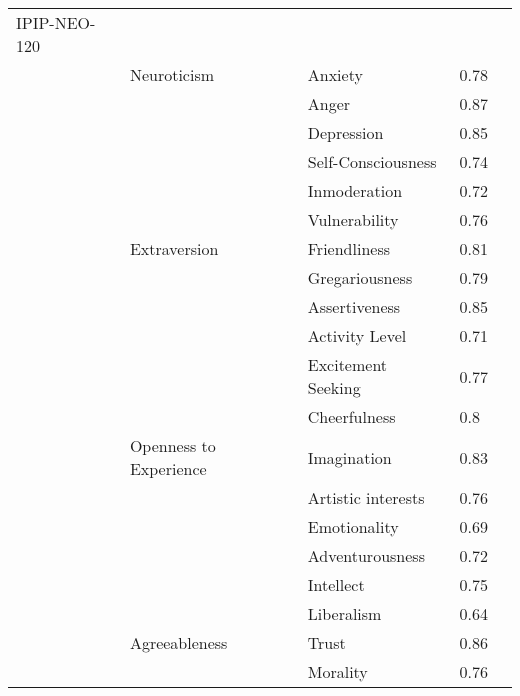 \documentclass[]{article}
\begin{document}
\begin{longtable}{@{\extracolsep{\fill}}*5{l}}
         
        IPIP-NEO-120 &                        &                      &             &   \\
             & Neuroticism            & Anxiety              & 0.78        &         \\
             &                        & Anger                & 0.87        &         \\
             &                        & Depression           & 0.85        &         \\
             &                        & Self-Consciousness   & 0.74        &         \\
             &                        & Inmoderation         & 0.72        &         \\
             &                        & Vulnerability        & 0.76        &         \\
             & Extraversion           & Friendliness         & 0.81        &         \\
             &                        & Gregariousness       & 0.79        &         \\
             &                        & Assertiveness        & 0.85        &         \\
             &                        & Activity Level       & 0.71        &         \\
             &                        & Excitement Seeking   & 0.77        &         \\
             &                        & Cheerfulness         & 0.8         &         \\
             & Openness to Experience & Imagination          & 0.83        &         \\
             &                        & Artistic interests   & 0.76        &         \\
             &                        & Emotionality         & 0.69        &         \\
             &                        & Adventurousness      & 0.72        &         \\
             &                        & Intellect            & 0.75        &         \\
             &                        & Liberalism           & 0.64        &         \\
             & Agreeableness          & Trust                & 0.86        &         \\
             &                        & Morality             & 0.76        &         \\

\end{longtable}
\end{document}

